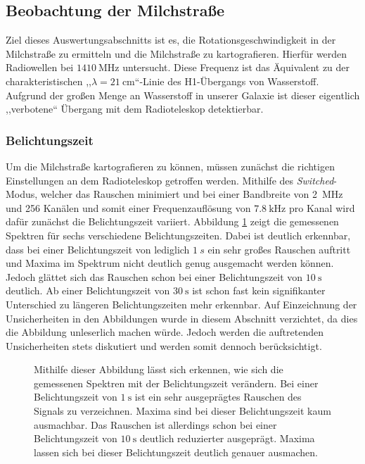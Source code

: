 \subsection{Beobachtung der Milchstraße}
Ziel dieses Auswertungsabschnitts ist es, die Rotationsgeschwindigkeit in der Milchstraße zu ermitteln und die Milchstraße zu kartografieren.\newline
Hierfür werden Radiowellen bei $\SI{1410}{\mega \hertz}$ untersucht. Diese Frequenz ist das Äquivalent zu der charakteristischen ,,$\lambda = \SI{21}{\centi \metre}$``-Linie des H1-Übergangs von Wasserstoff. Aufgrund der großen Menge an Wasserstoff in unserer Galaxie ist dieser eigentlich ,,verbotene`` Übergang mit dem Radioteleskop detektierbar.\newline
\subsubsection{Belichtungszeit}
Um die Milchstraße kartografieren zu können, müssen zunächst die richtigen Einstellungen an dem Radioteleskop getroffen werden. Mithilfe des \textit{Switched}-Modus, welcher das Rauschen minimiert und bei einer Bandbreite von \SI{2}{MHz} und 256 Kanälen und somit einer Frequenzauflösung von $\SI{7.8}{\kilo \hertz}$ pro Kanal \cite{Usermanual} wird dafür zunächst die Belichtungszeit variiert. Abbildung \ref{fig:Belichtungszeit} zeigt die gemessenen Spektren für sechs verschiedene Belichtungszeiten. Dabei ist deutlich erkennbar, dass bei einer Belichtungszeit von lediglich $\SI{1}{s}$ ein sehr großes Rauschen auftritt und Maxima im Spektrum nicht deutlich genug ausgemacht werden können. Jedoch glättet sich das Rauschen schon bei einer Belichtungszeit von $\SI{10}{\second}$ deutlich. Ab einer Belichtungszeit von $\SI{30}{\second}$ ist schon fast kein signifikanter Unterschied zu längeren Belichtungszeiten mehr erkennbar. Auf Einzeichnung der Unsicherheiten in den Abbildungen wurde in diesem Abschnitt verzichtet, da dies die Abbildung unleserlich machen würde. Jedoch werden die auftretenden Unsicherheiten stets diskutiert und werden somit dennoch berücksichtigt.
\begin{figure}[H]
    \centering
       
    \caption[Gemessene Spektren bei verschiedenen Belichtungszeiten]{Mithilfe dieser Abbildung lässt sich erkennen, wie sich die gemessenen Spektren mit der Belichtungszeit verändern. Bei einer Belichtungszeit von $\SI{1}{\second}$ ist ein sehr ausgeprägtes Rauschen des Signals zu verzeichnen. Maxima sind bei dieser Belichtungszeit kaum ausmachbar. Das Rauschen ist allerdings schon bei einer Belichtungszeit von $\SI{10}{\second}$ deutlich reduzierter ausgeprägt. Maxima lassen sich bei dieser Belichtungszeit deutlich genauer ausmachen.}
    \label{fig:Belichtungszeit}
\end{figure}

